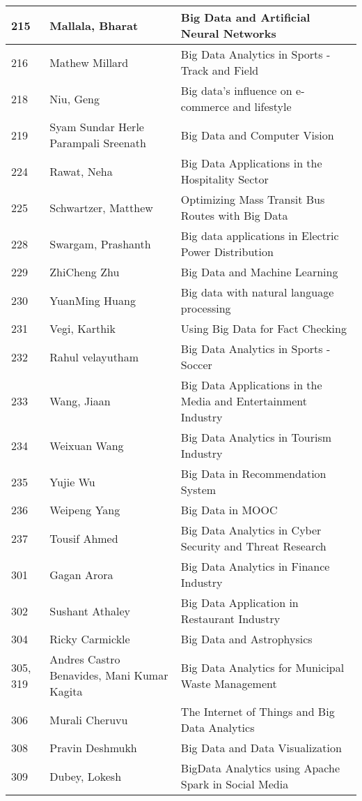 \documentclass[12pt]{book}
\begin{document}
\begin{footnotesize}
\begin{longtable}{|p{1cm}p{5cm}p{9cm}|}
215 & Mallala, Bharat & Big Data and Artificial Neural Networks  \\
\hline
216 & Mathew Millard & Big Data Analytics in Sports - Track and Field  \\
\hline
218 & Niu, Geng & Big data's influence on e-commerce and lifestyle  \\
\hline
219 & Syam Sundar Herle Parampali Sreenath & Big Data and Computer Vision  \\
\hline
224 & Rawat, Neha & Big Data Applications in the Hospitality Sector  \\
\hline
225 & Schwartzer, Matthew & Optimizing Mass Transit Bus Routes with Big Data  \\
\hline
228 & Swargam, Prashanth & Big data applications in Electric Power Distribution  \\
\hline
229 & ZhiCheng Zhu & Big Data and Machine Learning  \\
\hline
230 & YuanMing Huang & Big data with natural language processing  \\
\hline
231 & Vegi, Karthik & Using Big Data for Fact Checking  \\
\hline
232 & Rahul velayutham & Big Data Analytics in Sports - Soccer  \\
\hline
233 & Wang, Jiaan & Big Data Applications in the Media and Entertainment Industry  \\
\hline
234 & Weixuan Wang & Big Data Analytics in Tourism Industry  \\
\hline
235 & Yujie Wu & Big Data in Recommendation System  \\
\hline
236 & Weipeng Yang & Big Data in MOOC  \\
\hline
237 & Tousif Ahmed & Big Data Analytics in Cyber Security and Threat Research  \\
\hline
301 & Gagan Arora & Big Data Analytics in Finance Industry  \\
\hline
302 & Sushant Athaley & Big Data Application in Restaurant Industry  \\
\hline
304 & Ricky Carmickle & Big Data and Astrophysics  \\
\hline
305, 319 & Andres Castro Benavides, Mani Kumar Kagita & Big Data Analytics for Municipal Waste Management  \\
\hline
306 & Murali Cheruvu & The Internet of Things and Big Data Analytics  \\
\hline
308 & Pravin Deshmukh & Big Data and Data Visualization  \\
\hline
309 & Dubey, Lokesh & BigData Analytics using Apache Spark in Social Media  \\

\end{longtable}
\end{footnotesize}
\end{document}
